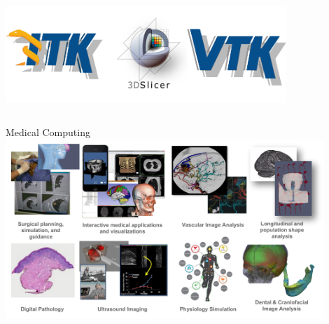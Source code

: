 \documentclass[10pt,aspectratio=169]{beamer}
\begin{document}
\begin{frame}
\begin{columns}[onlytextwidth]
    \includegraphics[width=0.9\textwidth]{./logos/kitware_itk_slicer_vtk_logos.png}
  \end{columns}

\end{frame}

{
\begin{frame}{Medical Computing}
    \centering
    \includegraphics[width=0.9\textwidth]{./logos/kitware_medical_HQ.png}
\end{frame}
}
\end{document}
